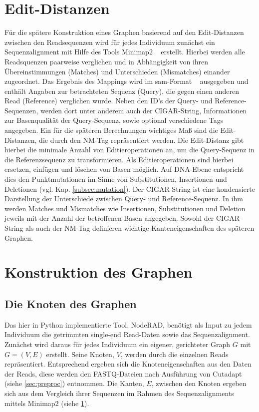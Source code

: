 \section{Edit-Distanzen} \label{sec:edit}
Für die spätere Konstruktion eines Graphen basierend auf den Edit-Distanzen zwischen den Readsequenzen wird für jedes Individuum zunächst ein Sequenzalignment mit Hilfe des Tools Minimap2 ~\cite{li_2018} erstellt. Hierbei werden alle Readsquenzen paarweise verglichen und in Abhängigkeit von ihren Übereinstimmungen (Matches) und Unterschieden (Mismatches) einander zugeordnet. Das Ergebnis des Mappings wird im sam-Format ~\cite{li_2009} ausgegeben und enthält Angaben zur betrachteten Sequenz (Query), die gegen einen anderen Read (Reference) verglichen wurde. Neben den ID's der Query- und Reference-Sequenzen, werden dort unter anderem auch der CIGAR-String, Informationen zur Basenqualität der Query-Sequenz, sowie optional verschiedene Tags angegeben. Ein für die späteren Berechnungen wichtiges Maß sind die Edit-Distanzen, die durch den NM-Tag repräsentiert werden. Die Edit-Distanz gibt hierbei die minimale Anzahl von Editieroperationen an, um die Query-Sequenz in die Referenzsequenz zu transformieren. Als Editieroperationen sind hierbei ersetzen, einfügen und löschen von Basen möglich. Auf DNA-Ebene entspricht dies den Punktmutationen im Sinne von Substitutionen, Insertionen und Deletionen (vgl. Kap. \ref{subsec:mutation}). Der CIGAR-String ist eine kondensierte Darstellung der Unterschiede zwischen Query- und Reference-Sequenz. In ihm werden Matches und Mismatches wie Insertionen, Substitutionen und Deletion jeweils mit der Anzahl der betroffenen Basen angegeben. Sowohl der CIGAR-String als auch der NM-Tag definieren wichtige Kanteneigenschaften des späteren Graphen. \\

\section{Konstruktion des Graphen} \label{sec:graph}
\subsection{Die Knoten des Graphen}
Das hier in Python implementierte Tool, NodeRAD, benötigt als Input zu jedem Individuum die getrimmten single-end Read-Daten sowie das Sequenzalignment. Zunächst wird daraus für jedes Individuum ein eigener, gerichteter Graph $ G $ mit $ G = (V,E) $ erstellt. Seine Knoten, $ V $, werden durch die einzelnen Reads repräsentiert. Entsprechend ergeben sich die Knoteneigenschaften aus den Daten der Reads, diese werden den FASTQ-Dateien nach Ausführung von Cutadapt (siehe \ref{sec:preproc}) entnommen. Die Kanten, $ E $, zwischen den Knoten ergeben sich aus dem Vergleich ihrer Sequenzen im Rahmen des Sequenzalignments mittels Minimap2 (siehe \ref{sec:edit}).\\

